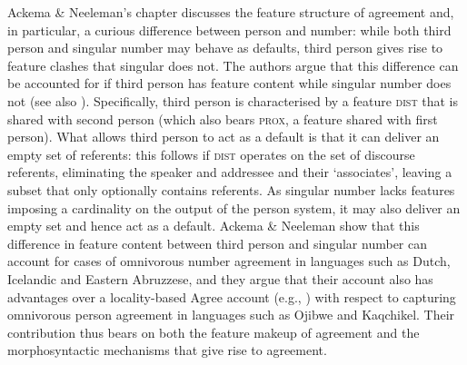 \documentclass[output=paper]{langsci/langscibook}
\begin{document}
Ackema \& Neeleman’s chapter discusses the feature structure of agreement and, in particular, a curious difference between person and number: while both third person and singular number may behave as defaults, third person gives rise to feature clashes that singular does not. The authors argue that this difference can be accounted for if third person has feature content while singular number does not (see also \citealt{Nevins2007,Nevins2011}). Specifically, third person is characterised by a feature \textsc{dist} that is shared with second person (which also bears \textsc{prox}, a feature shared with first person). What allows third person to act as a default is that it can deliver an empty set of referents: this follows if \textsc{dist} operates on the set of discourse referents, eliminating the speaker and addressee and their ‘associates’, leaving a subset that only optionally contains referents. As singular number lacks features imposing a cardinality on the output of the person system, it may also deliver an empty set and hence act as a default. Ackema \& Neeleman show that this difference in feature content between third person and singular number can account for cases of omnivorous number agreement in languages such as Dutch, Icelandic and Eastern Abruzzese, and they argue that their account also has advantages over a locality-based Agree account (e.g., \citealt{Preminger2014}) with respect to capturing omnivorous person agreement in languages such as Ojibwe and Kaqchikel. Their contribution thus bears on both the feature makeup of agreement and the morphosyntactic mechanisms that give rise to agreement.
\end{document}
